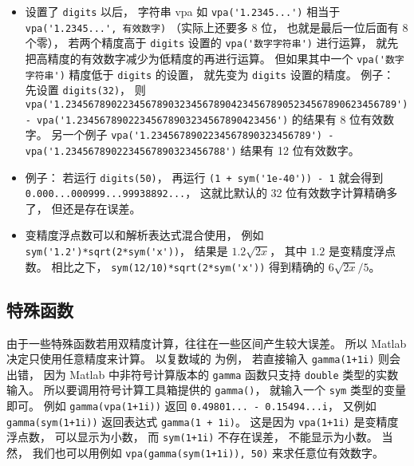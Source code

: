 \begin{itemize}
\item 设置了 \verb`digits` 以后， 字符串 vpa 如 \verb`vpa('1.2345...')` 相当于 \verb`vpa('1.2345...', 有效数字)` （实际上还要多 8 位， 也就是最后一位后面有 8 个零）， 若两个精度高于 \verb`digits` 设置的 \verb`vpa('数字字符串')` 进行运算， 就先把高精度的有效数字减少为低精度的再进行运算。 但如果其中一个 \verb`vpa('数字字符串')` 精度低于 \verb`digits` 的设置， 就先变为 \verb`digits` 设置的精度。 例子： 先设置 \verb`digits(32)`， 则 \verb`vpa('1.2345678902234567890323456789042345678905234567890623456789') - vpa('1.23456789022345678903234567890423456')` 的结果有 8 位有效数字。 另一个例子 \verb`vpa('1.2345678902234567890323456789') - vpa('1.2345678902234567890323456788')` 结果有 12 位有效数字。

\item 例子： 若运行 \verb`digits(50)`， 再运行 \verb`(1 + sym('1e-40')) - 1` 就会得到 \verb`0.000...000999...99938892...`， 这就比默认的 32 位有效数字计算精确多了， 但还是存在误差。

\item 变精度浮点数可以和解析表达式混合使用， 例如 \verb`sym('1.2')*sqrt(2*sym('x'))`， 结果是 $1.2 \sqrt{2x}$， 其中 $1.2$ 是变精度浮点数。 相比之下， \verb`sym(12/10)*sqrt(2*sym('x'))` 得到精确的 $6\sqrt{2x}/5$。
\end{itemize}

\subsection{特殊函数}
由于一些特殊函数若用双精度计算，往往在一些区间产生较大误差。 所以 Matlab 决定只使用任意精度来计算。 以复数域的  为例， 若直接输入 \verb`gamma(1+1i)` 则会出错， 因为 Matlab 中非符号计算版本的 \verb`gamma` 函数只支持 \verb`double` 类型的实数输入。 所以要调用符号计算工具箱提供的 \verb`gamma()`， 就输入一个 \verb`sym` 类型的变量即可。 例如 \verb`gamma(vpa(1+1i))` 返回 \verb`0.49801... - 0.15494...i`， 又例如 \verb`gamma(sym(1+1i))` 返回表达式 \verb`gamma(1 + 1i)`。 这是因为 \verb`vpa(1+1i)` 是变精度浮点数， 可以显示为小数， 而 \verb`sym(1+1i)` 不存在误差， 不能显示为小数。 当然， 我们也可以用例如 \verb`vpa(gamma(sym(1+1i)), 50)` 来求任意位有效数字。
